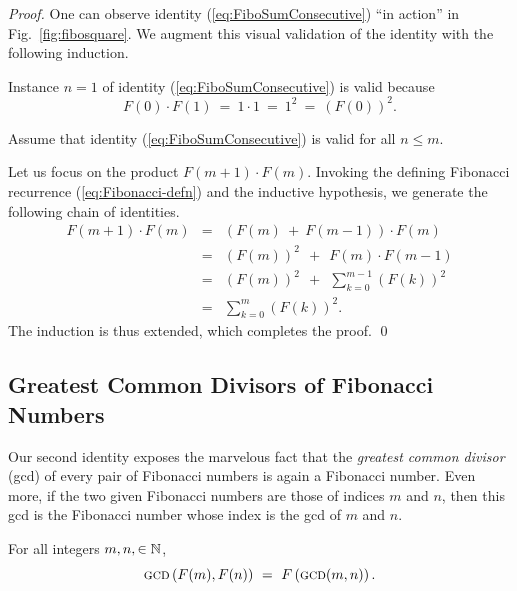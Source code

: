\begin{proof}
One can observe identity (\ref{eq:FiboSumConsecutive}) ``in action'' in Fig.~\ref{fig:fibosquare}.  We augment this visual validation of the identity with the following induction.

\medskip

Instance $n=1$ of identity (\ref{eq:FiboSumConsecutive}) is valid because
\[ F(0) \cdot F(1) \ = \ 1 \cdot 1 \ = \ 1^2 \ = \ (F(0))^2. \]

\medskip

Assume that identity (\ref{eq:FiboSumConsecutive}) is valid for all $n \leq m$.

\medskip

Let us focus on the product $F(m+1) \cdot F(m)$.  Invoking the defining Fibonacci recurrence
(\ref{eq:Fibonacci-defn}) and the inductive hypothesis, we generate the following chain of identities.
\begin{eqnarray*}
F(m+1) \cdot F(m)
 & = &
   (F(m) \ + \ F(m-1)) \cdot F(m) \\
 & = &
   (F(m))^2 \ \ + \ \ F(m) \cdot F(m-1)  \\
 & = & 
   (F(m))^2  \ \ + \ \ \sum_{k=0}^{m-1} (F(k))^2  \\
 & = &
   \sum_{k=0}^{m} (F(k))^2.
\end{eqnarray*}
The induction is thus extended, which completes the proof.  \qed
\end{proof}



\subsection{Greatest Common Divisors of Fibonacci Numbers}
\label{Appendix:FiboGCD}

Our second identity exposes the marvelous fact that the {\em greatest common divisor} ({\sc gcd}) of every pair of Fibonacci numbers is again a Fibonacci number.  Even more, if the two given Fibonacci numbers are those of indices $m$ and $n$, then this {\sc gcd} is the Fibonacci number whose index is the {\sc gcd} of $m$ and $n$.

\begin{prop}
For all integers $m, n, \in \mathbb{N}$,
\begin{equation}
\label{eq:fibo-gcd}
\mbox{\sc gcd} \left(F(m), F(n) \right) \ = \ F \left(\mbox{\sc gcd}(m, n) \right).
\end{equation}
\end{prop}

